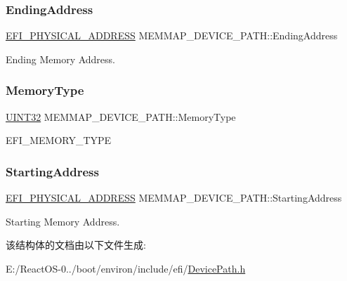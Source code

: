 \subsubsection{\texorpdfstring{Ending\+Address}{EndingAddress}}
{\footnotesize\ttfamily \hyperlink{_uefi_base_type_8h_a31bc7e7faeab8d2940ee34f21d41cd04}{E\+F\+I\+\_\+\+P\+H\+Y\+S\+I\+C\+A\+L\+\_\+\+A\+D\+D\+R\+E\+SS} M\+E\+M\+M\+A\+P\+\_\+\+D\+E\+V\+I\+C\+E\+\_\+\+P\+A\+T\+H\+::\+Ending\+Address}

Ending Memory Address. \mbox{\label{struct_m_e_m_m_a_p___d_e_v_i_c_e___p_a_t_h_a38bbd0ee43b1ae2127ca524c7b09c07c}} 
\subsubsection{\texorpdfstring{Memory\+Type}{MemoryType}}
{\footnotesize\ttfamily \hyperlink{_processor_bind_8h_ae1e6edbbc26d6fbc71a90190d0266018}{U\+I\+N\+T32} M\+E\+M\+M\+A\+P\+\_\+\+D\+E\+V\+I\+C\+E\+\_\+\+P\+A\+T\+H\+::\+Memory\+Type}

E\+F\+I\+\_\+\+M\+E\+M\+O\+R\+Y\+\_\+\+T\+Y\+PE \mbox{\label{struct_m_e_m_m_a_p___d_e_v_i_c_e___p_a_t_h_a099cb083fb521380e6451de7a28b768d}} 
\subsubsection{\texorpdfstring{Starting\+Address}{StartingAddress}}
{\footnotesize\ttfamily \hyperlink{_uefi_base_type_8h_a31bc7e7faeab8d2940ee34f21d41cd04}{E\+F\+I\+\_\+\+P\+H\+Y\+S\+I\+C\+A\+L\+\_\+\+A\+D\+D\+R\+E\+SS} M\+E\+M\+M\+A\+P\+\_\+\+D\+E\+V\+I\+C\+E\+\_\+\+P\+A\+T\+H\+::\+Starting\+Address}

Starting Memory Address. 

该结构体的文档由以下文件生成\+:\begin{DoxyCompactItemize}
\item 
E\+:/\+React\+O\+S-\/0../boot/environ/include/efi/\hyperlink{_device_path_8h}{Device\+Path.\+h}\end{DoxyCompactItemize}
